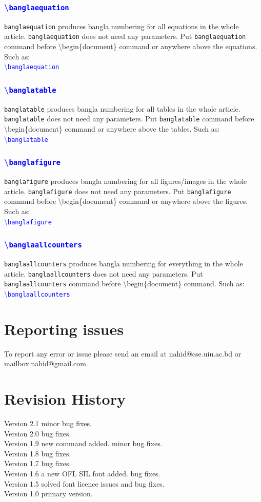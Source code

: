 \documentclass{article}
\newcommand{\com}[2]{\textcolor{blue}{\textbackslash\texttt{#1}}\texttt{#2}}
\begin{document}
\subsubsection{\com{banglaequation}{}}
\texttt{banglaequation} produces bangla numbering for all equations in the whole article. \texttt{banglaequation} does not need any parameters. 
Put \texttt{banglaequation} command before \textbackslash begin\{document\} command or anywhere above the equations. Such as:\\
\com{banglaequation}{}

\subsubsection{\com{banglatable}{}}
\texttt{banglatable} produces bangla numbering for all tables in the whole article. \texttt{banglatable} does not need any parameters. 
Put \texttt{banglatable} command before \textbackslash begin\{document\} command or anywhere above the tables. Such as:\\
\com{banglatable}{}


\subsubsection{\com{banglafigure}{}}
\texttt{banglafigure} produces bangla numbering for all figures/images in the whole article. \texttt{banglafigure} does not need any parameters. 
Put \texttt{banglafigure} command before \textbackslash begin\{document\} command or anywhere above the figures. Such as:\\
\com{banglafigure}{}


\subsubsection{\com{banglaallcounters}{}}
\texttt{banglaallcounters} produces bangla numbering for everything in the whole article. \texttt{banglaallcounters} does not need any parameters. 
Put \texttt{banglaallcounters} command before \textbackslash begin\{document\} command. Such as:\\
\com{banglaallcounters}{}

\section{Reporting issues}
To report any error or issue please send an email at nahid@cse.uiu.ac.bd or mailbox.nahid@gmail.com. 
\section{Revision History}
Version 2.1 minor bug fixes.\\
Version 2.0 bug fixes.\\
Version 1.9 new command added. minor bug fixes.\\
Version 1.8 bug fixes.\\
Version 1.7 bug fixes.\\  
Version 1.6 a new OFL SIL font added. bug fixes.\\  
Version 1.5 solved font licence issues and bug fixes.\\ 
Version 1.0 primary version.\\
\end{document}
